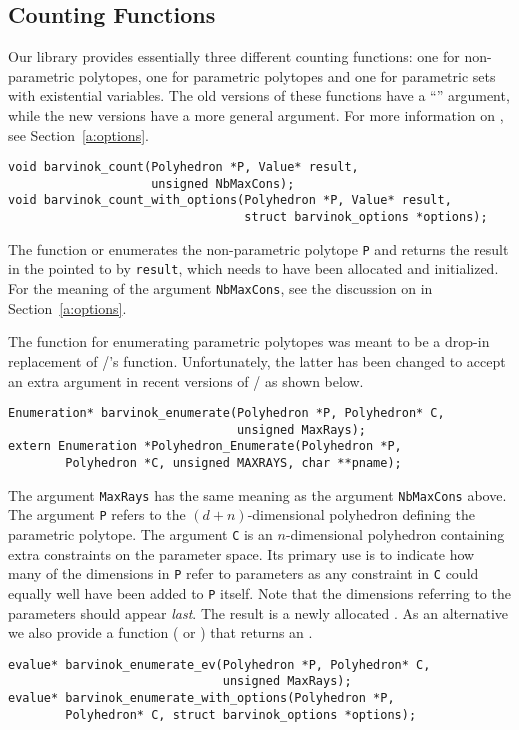 \subsection{Counting Functions}
\label{a:counting:functions}

Our library provides essentially three different counting functions:
one for non-parametric polytopes, one for parametric polytopes
and one for parametric sets with existential variables.
The old versions of these functions have a ``''
argument, while the new versions have a more general
 argument.
For more information on , see Section~\ref{a:options}.

\begin{verbatim}
void barvinok_count(Polyhedron *P, Value* result, 
                    unsigned NbMaxCons);
void barvinok_count_with_options(Polyhedron *P, Value* result,
                                 struct barvinok_options *options);
\end{verbatim}
The function  or
 enumerates the non-parametric
polytope \verb+P+ and returns the result in the 
pointed to by \verb+result+, which needs to have been allocated
and initialized.
For the meaning of the argument \verb+NbMaxCons+, see
the discussion on  in Section~\ref{a:options}.

The function  for enumerating
parametric polytopes was meant to be
a drop-in replacement of \PolyLib/'s 
function.
Unfortunately, the latter has been changed to
accept an extra argument in recent versions of \PolyLib/ as shown below.
\begin{verbatim}
Enumeration* barvinok_enumerate(Polyhedron *P, Polyhedron* C, 
                                unsigned MaxRays);
extern Enumeration *Polyhedron_Enumerate(Polyhedron *P,
	    Polyhedron *C, unsigned MAXRAYS, char **pname);
\end{verbatim}
The argument \verb+MaxRays+ has the same meaning as the argument
\verb+NbMaxCons+ above.
The argument \verb+P+ refers to the $(d+n)$-dimensional
polyhedron defining the parametric polytope.
The argument \verb+C+ is an $n$-dimensional polyhedron containing
extra constraints on the parameter space.
Its primary use is to indicate how many of the dimensions
in \verb+P+ refer to parameters as any constraint in \verb+C+
could equally well have been added to \verb+P+ itself.
Note that the dimensions referring to the parameters should
appear {\em last}.
The result is a newly allocated .
As an alternative we also provide a function 
( or
) that returns
an .
\begin{verbatim}
evalue* barvinok_enumerate_ev(Polyhedron *P, Polyhedron* C, 
                              unsigned MaxRays);
evalue* barvinok_enumerate_with_options(Polyhedron *P,
        Polyhedron* C, struct barvinok_options *options);
\end{verbatim}

